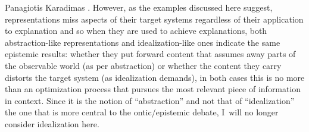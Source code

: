 \begin{artengenv}{Panagiotis Karadimas}
{\parencites[][]{love_idealization_2015}[][]{potochnik_idealization_2017}. %
 However, as the examples discussed here suggest, representations miss aspects of their target systems regardless of their application to explanation and so when they are used to achieve explanations, both abstraction-like representations and idealization-like ones indicate the same epistemic results: whether they put forward content that assumes away parts of the observable world (as per abstraction) or whether the content they carry distorts the target system (as idealization demands), in both cases this is no more than an optimization process that pursues the most relevant piece of information in context. Since it is the notion of ``abstraction'' and not that of ``idealization'' the one that is more central to the ontic/epistemic debate, I~will no longer consider idealization here.}


\end{artengenv}

